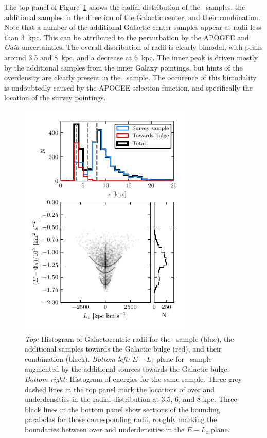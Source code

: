 The top panel of Figure~\ref{ch2:fig:APOGEERadialBias} shows the radial distribution of the \survey\ samples, the additional samples in the direction of the Galactic center, and their combination. Note that a number of the additional Galactic center samples appear at radii less than 3~kpc. This can be attributed to the perturbation by the APOGEE and \textit{Gaia} uncertainties. The overall distribution of radii is clearly bimodal, with peaks around 3.5 and 8~kpc, and a decrease at 6~kpc. The inner peak is driven mostly by the additional samples from the inner Galaxy pointings, but hints of the overdensity are clearly present in the \survey\ sample. The occurence of this bimodality is undoubtedly caused by the APOGEE selection function, and specifically the location of the survey pointings.

\begin{figure}
    \centering
    \includegraphics[width=0.75\textwidth]{figure/ch2/APOGEEHaloRadialBias.pdf}
    \caption{\textit{Top:} Histogram of Galactocentric radii for the \survey\ sample (blue), the additional samples towards the Galactic bulge (red), and their combination (black). \textit{Bottom left:} $E-L_{z}$ plane for \survey\ sample augmented by the additional sources towards the Galactic bulge. \textit{Bottom right:} Histogram of energies for the same sample. Three grey dashed lines in the top panel mark the locations of over and underdensities in the radial distribution at 3.5, 6, and 8 kpc. Three black lines in the bottom panel show sections of the bounding parabolas for those corresponding radii, roughly marking the boundaries between over and underdensities in the $E-L_{z}$ plane.}
    \label{ch2:fig:APOGEERadialBias}
\end{figure}


